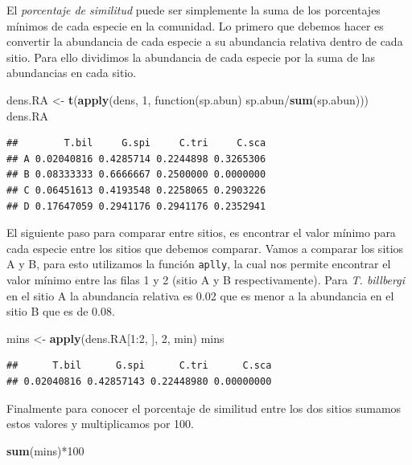 \documentclass[]{book}
\newenvironment{Shaded}{\begin{snugshade}}{\end{snugshade}}
\newcommand{\KeywordTok}[1]{\textcolor[rgb]{0.13,0.29,0.53}{\textbf{{#1}}}}
\newcommand{\DecValTok}[1]{\textcolor[rgb]{0.00,0.00,0.81}{{#1}}}
\newcommand{\StringTok}[1]{\textcolor[rgb]{0.31,0.60,0.02}{{#1}}}
\newcommand{\NormalTok}[1]{{#1}}
\begin{document}
El \emph{porcentaje de similitud} puede ser simplemente la suma de los
porcentajes mínimos de cada especie en la comunidad. Lo primero que
debemos hacer es convertir la abundancia de cada especie a su abundancia
relativa dentro de cada sitio. Para ello dividimos la abundancia de cada
especie por la suma de las abundancias en cada sitio.

\begin{Shaded}
\begin{Highlighting}[]
\NormalTok{dens.RA <-}\StringTok{ }\KeywordTok{t}\NormalTok{(}\KeywordTok{apply}\NormalTok{(dens, }\DecValTok{1}\NormalTok{, function(sp.abun) sp.abun/}\KeywordTok{sum}\NormalTok{(sp.abun)))}
\NormalTok{dens.RA}
\end{Highlighting}
\end{Shaded}

\begin{verbatim}
##        T.bil     G.spi     C.tri     C.sca
## A 0.02040816 0.4285714 0.2244898 0.3265306
## B 0.08333333 0.6666667 0.2500000 0.0000000
## C 0.06451613 0.4193548 0.2258065 0.2903226
## D 0.17647059 0.2941176 0.2941176 0.2352941
\end{verbatim}

El siguiente paso para comparar entre sitios, es encontrar el valor
mínimo para cada especie entre los sitios que debemos comparar. Vamos a
comparar los sitios A y B, para esto utilizamos la función
\texttt{aplly}, la cual nos permite encontrar el valor mínimo entre las
filas 1 y 2 (sitio A y B respectivamente). Para \emph{T. billbergi} en
el sitio A la abundancia relativa es 0.02 que es menor a la abundancia
en el sitio B que es de 0.08.

\begin{Shaded}
\begin{Highlighting}[]
\NormalTok{mins <-}\StringTok{ }\KeywordTok{apply}\NormalTok{(dens.RA[}\DecValTok{1}\NormalTok{:}\DecValTok{2}\NormalTok{, ], }\DecValTok{2}\NormalTok{, min)}
\NormalTok{mins}
\end{Highlighting}
\end{Shaded}

\begin{verbatim}
##      T.bil      G.spi      C.tri      C.sca 
## 0.02040816 0.42857143 0.22448980 0.00000000
\end{verbatim}

Finalmente para conocer el porcentaje de similitud entre los dos sitios
sumamos estos valores y multiplicamos por 100.

\begin{Shaded}
\begin{Highlighting}[]
\KeywordTok{sum}\NormalTok{(mins)*}\DecValTok{100}
\end{Highlighting}
\end{Shaded}
\end{document}
